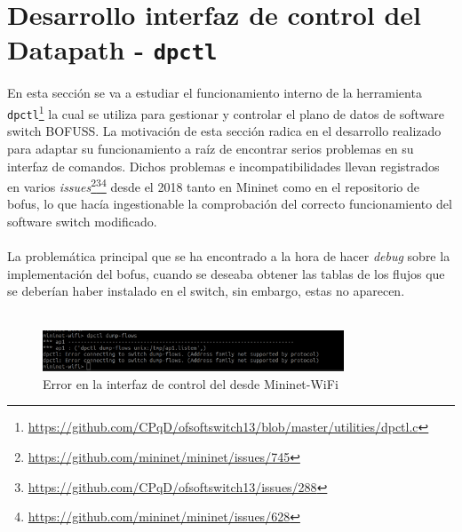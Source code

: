 \section{Desarrollo interfaz de control del Datapath - \texttt{dpctl}}
\label{sec:dpctl}

En esta sección se va a estudiar el funcionamiento interno de la herramienta \texttt{dpctl}\footnote{\url{https://github.com/CPqD/ofsoftswitch13/blob/master/utilities/dpctl.c}} la cual se utiliza para gestionar y controlar el plano de datos de software switch BOFUSS. La motivación de esta sección radica en el desarrollo realizado para adaptar su funcionamiento a raíz de encontrar serios problemas en su interfaz de comandos. Dichos problemas e incompatibilidades llevan registrados en varios \textit{issues}\footnote{\url{https://github.com/mininet/mininet/issues/745}}\footnote{\url{https://github.com/CPqD/ofsoftswitch13/issues/288}}\footnote{\url{https://github.com/mininet/mininet/issues/628}} desde el 2018 tanto en Mininet como en el repositorio de \gls{bofus}, lo que hacía ingestionable la comprobación del correcto funcionamiento del software switch modificado.\\
\\
La problemática principal que se ha encontrado a la hora de hacer \textit{debug} sobre la implementación del \gls{bofus}, cuando se deseaba obtener las tablas de los flujos que se deberían haber instalado en el switch, sin embargo, estas no aparecen.\\
\\

\begin{figure}[ht]
    \centering
    \includegraphics[width=0.8\textwidth]{archivos/img/dev/dpctl_1.png}
    \caption{Error en la interfaz de control del  desde Mininet-WiFi}
    \label{fig:dpctl_1}
\end{figure}

